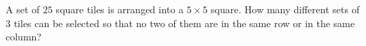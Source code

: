 A set of $25$ square tiles is arranged into a $5\times5$ square. How many different sets of $3$ tiles can be selected so that no two of them are in the same row or in the same column?
